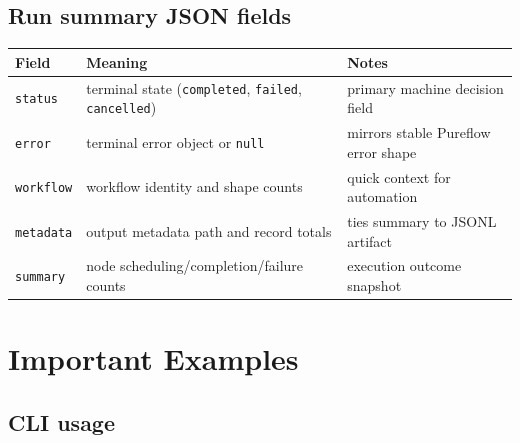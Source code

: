 \documentclass[
  letterpaper,
]{report}
\begin{document}
\subsection{Run summary JSON fields}\label{run-summary-json-fields}

\begin{longtable}[]{@{}
  >{\raggedright\arraybackslash}p{}
  >{\raggedright\arraybackslash}p{}
  >{\raggedright\arraybackslash}p{}@{}}
\toprule\noalign{}
\begin{minipage}[b]{\linewidth}\raggedright
Field
\end{minipage} & \begin{minipage}[b]{\linewidth}\raggedright
Meaning
\end{minipage} & \begin{minipage}[b]{\linewidth}\raggedright
Notes
\end{minipage} \\
\midrule\noalign{}
\endhead
\bottomrule\noalign{}
\endlastfoot
\texttt{status} & terminal state (\texttt{completed}, \texttt{failed},
\texttt{cancelled}) & primary machine decision field \\
\texttt{error} & terminal error object or \texttt{null} & mirrors stable
Pureflow error shape \\
\texttt{workflow} & workflow identity and shape counts & quick context
for automation \\
\texttt{metadata} & output metadata path and record totals & ties
summary to JSONL artifact \\
\texttt{summary} & node scheduling/completion/failure counts & execution
outcome snapshot \\
\end{longtable}

\section{Important Examples}\label{important-examples}

\subsection{CLI usage}\label{cli-usage}
\end{document}
